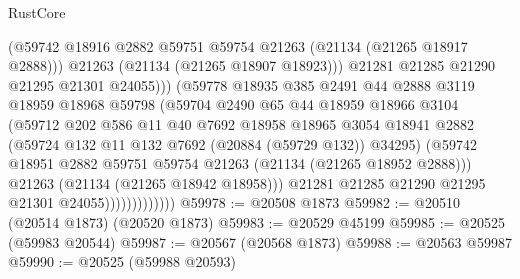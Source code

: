 \begin{lexlean}{RustCore}
\begin{coremodule}
                                  (@59742
                                    @18916
                                    @2882
                                    @59751
                                    @59754
                                    @21263
                                    (@21134 (@21265 @18917 @2888)))
                                  @21263
                                  (@21134 (@21265 @18907 @18923)))
                                @21281
                                @21285
                                @21290
                                @21295
                                @21301
                                @24055)))
                          (@59778
                            @18935
                            @385
                            @2491
                            @44
                            @2888
                            @3119
                            @18959
                            @18968
                            @59798
                            (@59704
                              @2490
                              @65
                              @44
                              @18959
                              @18966
                              @3104
                              (@59712
                                @202
                                @586
                                @11
                                @40
                                @7692
                                @18958
                                @18965
                                @3054
                                @18941
                                @2882
                                (@59724 @132 @11 @132 @7692 (@20884 (@59729 @132)) @34295)
                                (@59742
                                  @18951
                                  @2882
                                  @59751
                                  @59754
                                  @21263
                                  (@21134 (@21265 @18952 @2888)))
                                @21263
                                (@21134 (@21265 @18942 @18958)))
                              @21281
                              @21285
                              @21290
                              @21295
                              @21301
                              @24055)))))))))))))
@59978 := @20508 @1873
@59982 := @20510 (@20514 @1873) (@20520 @1873)
@59983 := @20529 @45199
@59985 := @20525 (@59983 @20544)
@59987 := @20567 (@20568 @1873)
@59988 := @20563 @59987
@59990 := @20525 (@59988 @20593)

\end{coremodule}
\end{lexlean}
